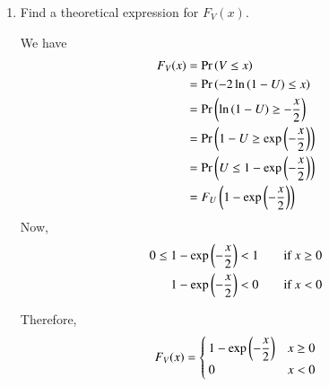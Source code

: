 \documentclass[journal,12pt,twocolumn]{IEEEtran}
\renewcommand\thesection{\arabic{section}}
\begin{document}
\begin{enumerate}[label=\thesection.\arabic*
,ref=\thesection.\theenumi]
\item Find a theoretical expression for $F_V(x)$.

\solution We have
\begin{align}
	F_V(x) &= \Pr\left(V \le x\right) \\
	&= \Pr\left(-2\ln\left(1-U\right) \le x\right) \\
	&= \Pr\left(\ln\left(1-U\right) \ge -\frac{x}{2}\right) \\
	&= \Pr\left(1-U \ge \exp\left(-\frac{x}{2}\right)\right) \\
	&= \Pr\left(U \le 1 - \exp\left(-\frac{x}{2}\right)\right) \\
	&= F_U\left(1 - \exp\left(-\frac{x}{2}\right)\right)
\end{align}
Now,
\begin{align}
	0 \le 1-\exp\left(-\frac{x}{2}\right) &< 1 \qquad \text{if } x \ge 0	\\	
	1-\exp\left(-\frac{x}{2}\right) &< 0 \qquad \text{if } x < 0	
\end{align}

Therefore,
\begin{align}
	F_V(x) = 
	\begin{cases}
		1-\exp\left(-\dfrac{x}{2}\right) & x \ge 0 \\
		0 & x < 0
	\end{cases}
\end{align}

\end{enumerate}

%



\end{document}
